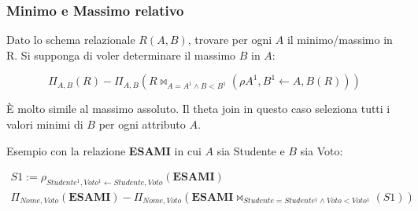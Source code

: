 \subsubsection{Minimo e Massimo relativo}

Dato lo schema relazionale $R(A,B)$, trovare per ogni $A$ il minimo/massimo in R.
Si supponga di voler determinare il massimo $B$ in $A$:

\begin{displaymath}
  \Pi_{A,B}(R) - \Pi_{A,B}(R \bowtie_{A=A^1 \land B<B^1}(\rho{A^1,B^1 \leftarrow A,B}(R)))
\end{displaymath}

È molto simile al massimo assoluto. Il theta join in questo caso seleziona tutti i valori
minimi di $B$ per ogni attributo $A$.

\noindent
Esempio con la relazione \textbf{ESAMI} in cui $A$ sia Studente e $B$ sia Voto:

\begin{gather*}
  S1 := \rho_{Studente^1,Voto^1 \leftarrow Studente,Voto}(\textbf{ESAMI}) \\
  \Pi_{Nome,Voto}(\textbf{ESAMI}) - \Pi_{Nome,Voto}(\textbf{ESAMI} \bowtie_{Studente=Studente^1 \land Voto<Voto^1}(S1))
\end{gather*}